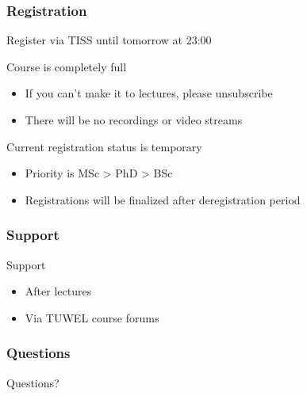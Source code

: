 \documentclass[xetex,professionalfont]{beamer}
\begin{document}
\begin{frame}
  \frametitle{Registration}
  Register via TISS until tomorrow at 23:00

  \bigskip
  Course is completely full
  \begin{itemize}
    \item If you can't make it to lectures, please unsubscribe
    \item There will be no recordings or video streams
  \end{itemize}

  \bigskip
  Current registration status is temporary
  \begin{itemize}
    \item Priority is MSc > PhD > BSc
    \item Registrations will be finalized after deregistration period
  \end{itemize}
\end{frame}


\begin{frame}
  \frametitle{Support}
  Support
  \begin{itemize}
    \item After lectures
    \item Via TUWEL course forums
  \end{itemize}
\end{frame}


\begin{frame}
\frametitle{Questions}

\begin{center}
Questions?
\end{center}

\end{frame}
\end{document}
